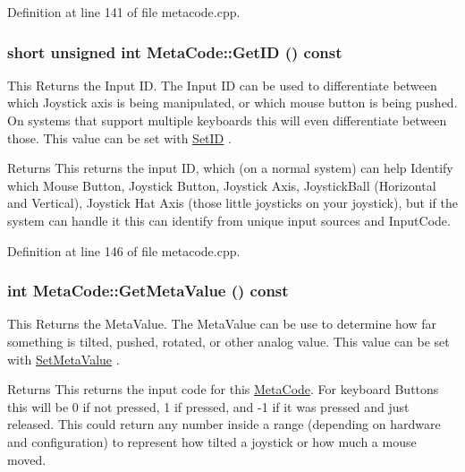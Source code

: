 Definition at line 141 of file metacode.cpp.\hypertarget{classMetaCode_a680b5e1c2ce8d8d08d00f10187728547}{
\subsubsection[{GetID}]{\setlength{\rightskip}{0pt plus 5cm}short unsigned int MetaCode::GetID () const}}
\label{d7/d72/classMetaCode_a680b5e1c2ce8d8d08d00f10187728547}


This Returns the Input ID. The Input ID can be used to differentiate between which Joystick axis is being manipulated, or which mouse button is being pushed. On systems that support multiple keyboards this will even differentiate between those. This value can be set with \hyperlink{classMetaCode_a0eb10030320a1fcfdda3b867b90e629f}{SetID} . \begin{DoxyReturn}{Returns}
This returns the input ID, which (on a normal system) can help Identify which Mouse Button, Joystick Button, Joystick Axis, JoystickBall (Horizontal and Vertical), Joystick Hat Axis (those little joysticks on your joystick), but if the system can handle it this can identify from unique input sources and InputCode. 
\end{DoxyReturn}


Definition at line 146 of file metacode.cpp.\hypertarget{classMetaCode_a8d9cd9709ab51323d7061cf7b0ea4ee2}{
\subsubsection[{GetMetaValue}]{\setlength{\rightskip}{0pt plus 5cm}int MetaCode::GetMetaValue () const}}
\label{d7/d72/classMetaCode_a8d9cd9709ab51323d7061cf7b0ea4ee2}


This Returns the MetaValue. The MetaValue can be use to determine how far something is tilted, pushed, rotated, or other analog value. This value can be set with \hyperlink{classMetaCode_a1e410df95815b4d7e94b971bb1b8ba1e}{SetMetaValue} . \begin{DoxyReturn}{Returns}
This returns the input code for this \hyperlink{classMetaCode}{MetaCode}. For keyboard Buttons this will be 0 if not pressed, 1 if pressed, and -\/1 if it was pressed and just released. This could return any number inside a range (depending on hardware and configuration) to represent how tilted a joystick or how much a mouse moved. 
\end{DoxyReturn}


